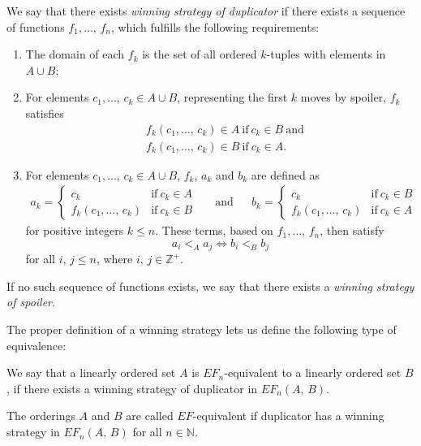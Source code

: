 \documentclass[../../main.tex]{subfiles}
\begin{document}
\begin{definition}
    We say that there exists \textit{winning strategy of duplicator} if there exists a sequence of functions $f_1,\ldots,\,f_n$,
    which fulfills the following requirements:
    \begin{enumerate}[label=(\roman*)]
        \item The domain of each $f_k$ is the set of all ordered $k$-tuples with elements in $A \cup B$;
        \item For elements $c_1,\ldots,\, c_k \in A \cup B$, representing the first $k$ moves by spoiler, $f_k$ satisfies
              \begin{align*}
                    &f_k(c_1,\ldots,\, c_k) \in A \ \text{if} \ c_k \in B \ \text{and}\\
                    &f_k(c_1,\ldots,\, c_k) \in B \ \text{if} \ c_k \in A.
              \end{align*}
        \item For elements $c_1,\ldots,\, c_k \in A \cup B$, $f_k$, $a_k$ and $b_k$ are defined as
              \begin{align*}
                a_k = \begin{cases}
                        c_k \ &\text{if} \ c_k \in A \\
                        f_k(c_1,\ldots,\, c_k) &\text{if} \ c_k \in B
                    \end{cases} 
                    && \text{and} &&
                    b_k = \begin{cases}
                        c_k \ &\text{if} \ c_k \in B \\
                        f_k(c_1,\ldots,\, c_k) &\text{if} \ c_k \in A
                    \end{cases}
              \end{align*}
              for positive integers $k \leq n$.
              These terms, based on $f_1,\ldots,\,f_n$, then satisfy $$a_i <_A a_j \iff b_i <_B b_j$$ for all $i,\, j \leq n$, where $i,\, j \in \mathbb{Z}^+$.
    \end{enumerate}
    If no such sequence of functions exists, we say that there exists a \textit{winning strategy of spoiler}.
\end{definition}

The proper definition of a winning strategy lets us define the following type of equivalence:
\begin{definition}[$EF_n$-equivalence]\cite[Definition 6.8]{Ros82}
    We say that a linearly ordered set $A$ is $EF_n$-equivalent to a linearly ordered set $B$,
    if there exists a winning strategy of duplicator in $EF_n(A,\, B)$.

    The orderings $A$ and $B$ are called $EF$-equivalent if duplicator has a winning strategy in $EF_n(A,\, B)$ for all $n \in \mathbb{N}$.
\end{definition}
\end{document}
